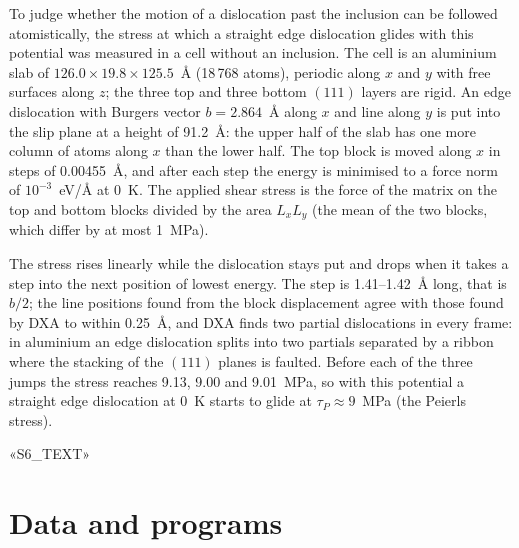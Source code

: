 \documentclass[11pt,a4paper]{article}
\begin{document}
To judge whether the motion of a dislocation past the inclusion can be
followed atomistically, the stress at which a straight edge dislocation
glides with this potential was measured in a cell without an inclusion. The
cell is an aluminium slab of $126.0\times19.8\times125.5$~\AA{} (18\,768
atoms), periodic along $x$ and $y$ with free surfaces along $z$; the three
top and three bottom $(111)$ layers are rigid. An edge dislocation with
Burgers vector $b=2.864$~\AA{} along $x$ and line along $y$ is put into the
slip plane at a height of 91.2~\AA{}: the upper half of the slab has one
more column of atoms along $x$ than the lower half. The top block is moved
along $x$ in steps of 0.00455~\AA, and after each step the energy is
minimised to a force norm of $10^{-3}$~eV/\AA{} at 0~K. The applied shear
stress is the force of the matrix on the top and bottom blocks divided by
the area $L_xL_y$ (the mean of the two blocks, which differ by at most
1~MPa).

The stress rises linearly while the dislocation stays put and drops when it
takes a step into the next position of lowest energy. The step is
1.41--1.42~\AA{} long, that is $b/2$; the line positions found from the
block displacement agree with those found by DXA \cite{Stukowski2012DXA}
to within 0.25~\AA, and DXA finds two partial dislocations in every frame:
in aluminium an edge dislocation splits into two partials separated by a
ribbon where the stacking of the $(111)$ planes is faulted.
Before each of the three jumps the stress reaches 9.13, 9.00 and 9.01~MPa,
so with this potential a straight edge dislocation at 0~K starts to glide at
$\tau_P\approx9$~MPa (the Peierls stress).

«S6_TEXT»

\section{Data and programs}
\sloppy
\end{document}

